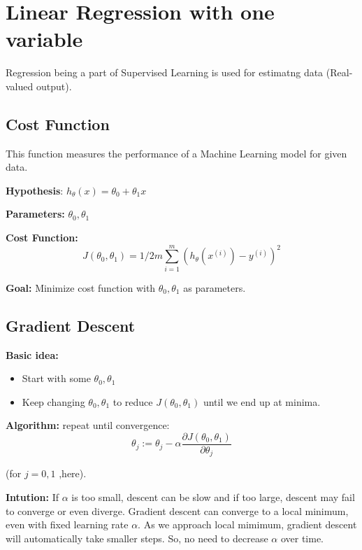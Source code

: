 \documentclass[12pt]{report}
\begin{document}
\section{Linear Regression with one variable}
  Regression being a part of Supervised Learning is used for estimatng data (Real-valued output).  

  \subsection{Cost Function}
    This function measures the performance of a Machine Learning model for given data.

    \textbf{Hypothesis}: $ h_ \theta(x) = \theta_0 + \theta_1x $

    \textbf{Parameters:} $ \theta_0, \theta_1 $

    \textbf{Cost Function:} 
    \begin{equation} \label {eq:1}
      J( \theta_0, \theta_1 ) = 1/2m \sum_{i=1}^{m} (h_\theta(x^{(i)})-y^{(i)})^2 
    \end{equation} 

    \textbf{Goal:} Minimize cost function with $ \theta_0, \theta_1 $ as parameters.

  \subsection{Gradient Descent}

    \textbf{Basic idea:}
    \begin{itemize}
    \item Start with some $ \theta_0, \theta_1 $
    \item Keep changing $ \theta_0, \theta_1 $ to reduce $ J(\theta_0, \theta_1) $ until we end up at minima.
    \end{itemize} 

    \textbf{Algorithm:}
     repeat until convergence:
    \begin{equation} \label {eq:2}
      \theta_j := \theta_j - \alpha \frac{\partial {J(\theta_0, \theta_1)}}{\partial \theta_j}
    \end{equation} 

    (for  $j = 0, 1 $  ,here).  

    \textbf{Intution:} 
    If $\alpha$ is too small, descent can be slow and if too large, descent may fail to converge or even diverge.
    Gradient descent can converge to a local minimum, even with fixed learning rate $\alpha$. As we approach local mimimum, gradient descent will automatically take smaller steps. So, no need to decrease $\alpha$ over time. 
\end{document}

